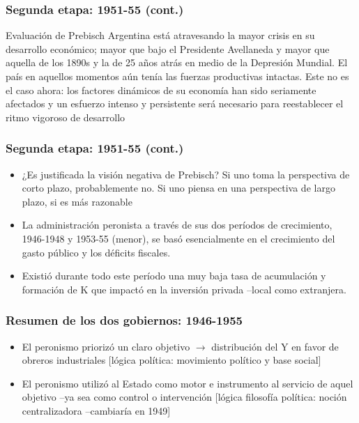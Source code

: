 \documentclass[14pt,aspectratio=169]{beamer}
\begin{document}
  \begin{frame}\frametitle{Segunda etapa: 1951-55 (cont.)}
    \begin{block}{Evaluación de Prebisch}
        Argentina está atravesando la mayor crisis en su desarrollo
        económico; mayor que bajo el Presidente Avellaneda y mayor que
        aquella de los 1890s y la de 25 años atrás en medio de la
        Depresión Mundial. El país en aquellos momentos aún tenía las
        fuerzas productivas intactas. Este no es el caso ahora: los
        factores dinámicos de su economía han sido seriamente
        afectados y un esfuerzo intenso y persistente será necesario
        para reestablecer el ritmo vigoroso de desarrollo
        \end{block}
               \end{frame}


                 \begin{frame}\frametitle{Segunda etapa: 1951-55 (cont.)}
  \begin{itemize}\itemsep 10pt
      \item ¿Es justificada la visión negativa de Prebisch? Si uno
        toma la perspectiva de corto plazo, probablemente no. Si uno
        piensa en una perspectiva de largo plazo, si es más razonable
        \item La administración peronista a través de sus dos períodos
          de crecimiento, 1946-1948 y 1953-55 (menor), se basó
          esencialmente en el crecimiento del gasto público y los
          déficits fiscales.
          \item Existió durante todo este período una muy baja tasa de
            acumulación y formación de K que impactó en la inversión
            privada --local como extranjera. 
                 \end{itemize}
               \end{frame}


     \begin{frame}\frametitle{Resumen de los dos gobiernos: 1946-1955}
  \begin{itemize}\itemsep 10pt
      \item El peronismo priorizó un claro objetivo $\longrightarrow$
        distribución del Y en favor de obreros industriales [lógica
        política: movimiento político y base social]
        \item El peronismo utilizó al Estado como motor e instrumento
          al servicio de aquel objetivo --ya sea como control o
          intervención [lógica filosofía política: noción
          centralizadora --cambiaría en 1949] 
                 \end{itemize}
               \end{frame}
\end{document}
